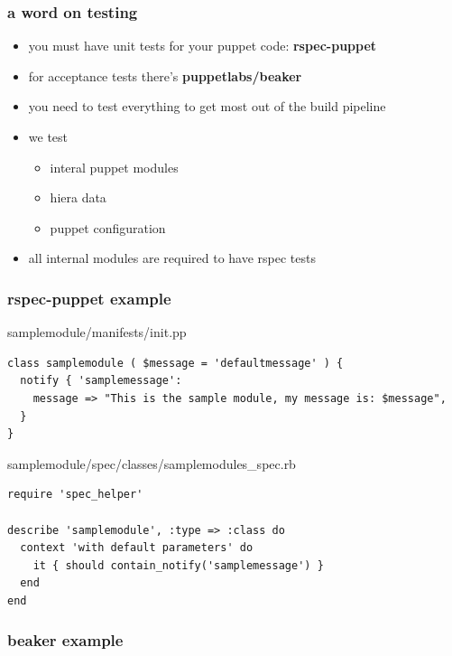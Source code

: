 \documentclass{beamer}
\begin{document}
\begin{frame}
  \frametitle{a word on testing}

  \begin{itemize}
  \item you must have unit tests for your puppet code: \textbf{rspec-puppet}
  \item for acceptance tests there's \textbf{puppetlabs/beaker}
  \item you need to test everything to get most out of the build
    pipeline
  \item we test
    \begin{itemize}
    \item interal puppet modules
    \item hiera data
    \item puppet configuration
    \end{itemize}
    \item all internal modules are required to have rspec tests
  \end{itemize}
\end{frame}

\begin{frame}
  \frametitle{rspec-puppet example}

  samplemodule/manifests/init.pp

\begin{lstlisting}
class samplemodule ( $message = 'defaultmessage' ) {
  notify { 'samplemessage':
    message => "This is the sample module, my message is: $message",
  }
}
\end{lstlisting}

  samplemodule/spec/classes/samplemodules\_spec.rb

  \begin{lstlisting}
require 'spec_helper'

describe 'samplemodule', :type => :class do
  context 'with default parameters' do
    it { should contain_notify('samplemessage') }
  end
end
  \end{lstlisting}

\end{frame}

\begin{frame}
  \frametitle{beaker example}

\end{frame}

\begin{frame}
\end{frame}
\end{document}
